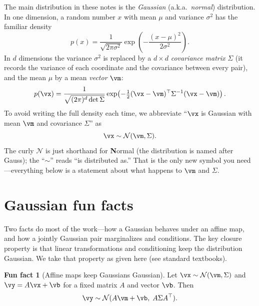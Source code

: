 \documentclass[11pt]{article}
\theoremstyle{plain}
\theoremstyle{definition}
\theoremstyle{remark}
\theoremstyle{definition}
\newtheorem{funfact}{Fun fact}
\newcommand{\Normal}{\mathcal{N}}
\begin{document}
The main distribution in these notes is the \emph{Gaussian} (a.k.a.\ \emph{normal})
distribution. In one dimension, a random number $x$ with mean
$\mu$ and variance $\sigma^2$ has the familiar density
\begin{equation}\label{eq:gauss1d}
    p(x) = \frac{1}{\sqrt{2\pi\sigma^2}}
           \exp\!\left(-\frac{(x-\mu)^2}{2\sigma^2}\right).
\end{equation}
In $d$ dimensions the variance $\sigma^2$ is replaced by a $d \times d$
\emph{covariance matrix} $\Sigma$ (it records the variance of each coordinate and
the covariance between every pair), and the mean $\mu$ by a mean \emph{vector}
$\vm$:
\begin{equation}\label{eq:gaussmv}
    p(\vx) = \frac{1}{\sqrt{(2\pi)^d \det \Sigma}}
             \exp\!\left(-\tfrac{1}{2}(\vx-\vm)\trp \Sigma^{-1} (\vx-\vm)\right).
\end{equation}
To avoid writing the full density each time, we abbreviate ``$\vx$ is Gaussian
with mean $\vm$ and covariance $\Sigma$'' as
\begin{equation}\label{eq:normalnotation}
    \vx \sim \Normal(\vm, \Sigma).
\end{equation}
The curly $\Normal$ is just shorthand for \textbf{N}ormal (the distribution is
named after Gauss); the ``$\sim$'' reads ``is distributed as.'' That is the only
new symbol you need---everything below is a statement about what happens to
$\vm$ and $\Sigma$.

\section{Gaussian fun facts}\label{sec:facts}

Two facts do most of the work---how a Gaussian behaves under an affine map, and
how a jointly Gaussian pair marginalizes and conditions. The key closure
property is that linear transformations and conditioning keep the distribution
Gaussian. We take that property as given here (see standard textbooks).

\begin{funfact}[Affine maps keep Gaussians Gaussian]\label{fact:affine}
Let $\vx \sim \Normal(\vm, \Sigma)$ and $\vy = A\vx + \vb$ for a fixed matrix
$A$ and vector $\vb$. Then
\begin{equation}\label{eq:affine}
    \vy \sim \Normal(A\vm + \vb,\; A \Sigma A\trp).
\end{equation}
\end{funfact}
\end{document}

